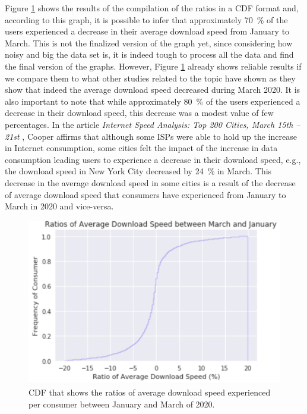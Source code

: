 \documentclass[conference,10pt]{IEEEtran}
\begin{document}
Figure \ref{fig:downloadspeed2020} shows the results of the compilation of the ratios in a CDF format and, according to this graph, it is possible to infer that approximately \SI{70}{\percent} of the users experienced a decrease in their average download speed from January to March. This is not the finalized version of the graph yet, since considering how noisy and big the data set is, it is indeed tough to process all the data and find the final version of the graphs. However, Figure \ref{fig:downloadspeed2020} already shows reliable results if we compare them to what other studies related to the topic have shown as they show that indeed the average download speed decreased during March 2020. It is also important to note that while approximately \SI{80}{\percent} of the users experienced a decrease in their download speed, this decrease was a modest value of few percentages. In the article \textit{ Internet Speed Analysis: Top 200 Cities, March 15th – 21st} \cite{cooper}, Cooper affirms that although some ISPs were able to hold up the increase in  Internet consumption, some cities felt the impact of the increase in data consumption leading users to experience a decrease in their download speed, e.g., the download speed in New York City decreased by \SI{24}{\percent} in March. This decrease in the average download speed in some cities is a result of the decrease of average download speed that consumers have experienced from January to March in 2020 and vice-versa.

\begin{figure}
\centering
\includegraphics[width=1.0\linewidth]{figs/downspeed.PNG}
\caption{CDF that shows the ratios of average download speed experienced per consumer between January and March of 2020.}
\label{fig:downloadspeed2020}
\end{figure}
\end{document}
